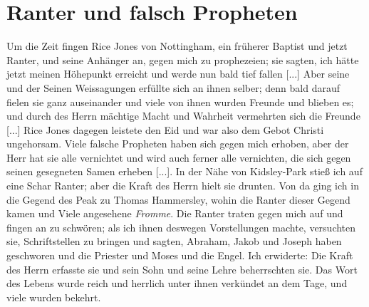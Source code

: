 \section{Ranter und falsch Propheten}

Um die Zeit fingen Rice Jones 
von Nottingham, ein früherer
Baptist und jetzt Ranter, und 
seine Anhänger an, gegen mich
zu prophezeien; sie sagten, ich hätte 
jetzt meinen Höhepunkt
erreicht und werde nun bald tief fallen [...] Aber seine und
der Seinen Weissagungen erfüllte sich 
an ihnen selber; denn bald
darauf fielen sie ganz auseinander und viele von ihnen wurden
Freunde und blieben es; und durch des Herrn mächtige Macht und
Wahrheit vermehrten sich die Freunde [...] Rice Jones 
dagegen leistete den Eid und war also dem Gebot Christi 
ungehorsam. Viele falsche Propheten 
haben sich gegen mich erhoben,
aber der Herr hat sie alle vernichtet und wird auch ferner alle
vernichten, die sich gegen seinen gesegneten Samen erheben [...].
In der Nähe von Kidsley-Park stieß ich auf 
eine Schar Ranter; aber die Kraft des Herrn 
hielt sie drunten. Von da
ging ich in die Gegend des Peak zu Thomas 
Hammersley,
wohin die Ranter dieser Gegend kamen und Viele angesehene
\textit{Fromme}. Die Ranter traten gegen mich auf und fingen an
zu schwören; als ich ihnen deswegen Vorstellungen machte, 
versuchten sie, Schriftstellen zu bringen und sagten, Abraham, Jakob
und Joseph haben geschworen und die Priester und Moses und
die Engel. Ich erwiderte:  Die Kraft 
des Herrn erfasste sie und sein
Sohn und seine Lehre beherrschten sie. Das Wort des Lebens
wurde reich und herrlich unter ihnen verkündet an dem Tage,
und viele wurden bekehrt.


